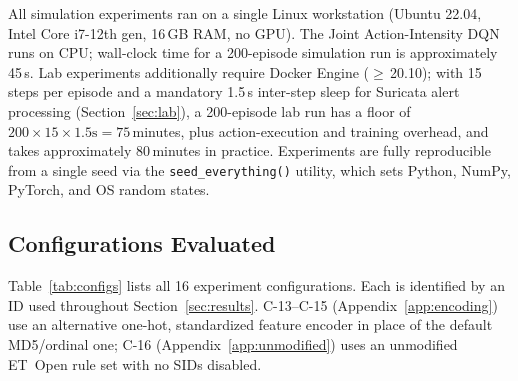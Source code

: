 \documentclass[sigconf]{acmart}
\begin{document}
All simulation experiments ran on a single Linux workstation (Ubuntu
22.04, Intel Core i7-12th gen, 16\,GB RAM, no GPU). The
Joint Action-Intensity DQN runs on CPU; wall-clock time for a 200-episode
simulation run is approximately 45\,s. Lab experiments additionally
require Docker Engine ($\geq$\,20.10); with 15 steps per episode and a
mandatory 1.5\,s inter-step sleep for Suricata alert processing
(Section~\ref{sec:lab}), a 200-episode lab run has a floor of
$200 \times 15 \times 1.5\text{s} = 75$\,minutes, plus action-execution
and training overhead, and takes approximately 80\,minutes in practice.
Experiments are
fully reproducible from a single seed via the \texttt{seed\_every\-thing()}
utility, which sets Python, NumPy, PyTorch, and OS random states.

\subsection{Configurations Evaluated}
\label{sec:configs}

Table~\ref{tab:configs} lists all 16 experiment configurations. Each
is identified by an ID used throughout Section~\ref{sec:results}.
C-13--C-15 (Appendix~\ref{app:encoding}) use an alternative one-hot,
standardized feature encoder in place of the default MD5/ordinal one;
C-16 (Appendix~\ref{app:unmodified}) uses an unmodified ET~Open rule
set with no SIDs disabled.
\end{document}
